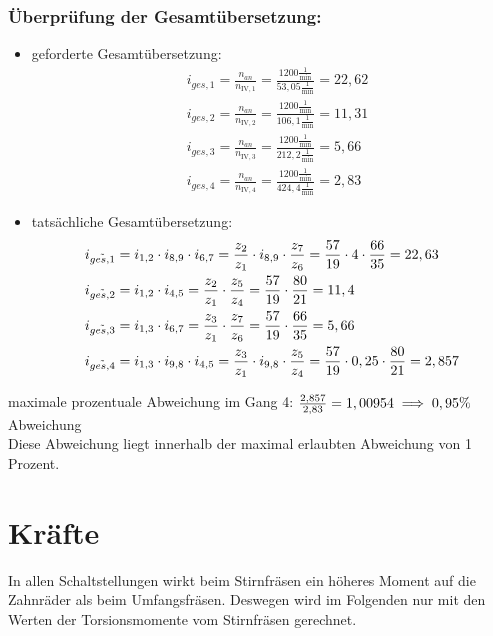 \subsubsection{Überprüfung der Gesamtübersetzung:}
\begin{itemize}
\item geforderte Gesamtübersetzung:
\begin{align*}
	&i_{ges,1} = \frac{n_{an}}{n_{\mathrm{IV},1}} = \frac{1200 \frac{1}{\text{min}}}{53,05 \frac{1}{\text{min}}} = 22,62 \\
	&i_{ges,2} = \frac{n_{an}}{n_{\mathrm{IV},2}} = \frac{1200 \frac{1}{\text{min}}}{106,1 \frac{1}{\text{min}}} = 11,31 \\
	&i_{ges,3} = \frac{n_{an}}{n_{\mathrm{IV},3}} = \frac{1200 \frac{1}{\text{min}}}{212,2 \frac{1}{\text{min}}} = 5,66 \\
	&i_{ges,4} = \frac{n_{an}}{n_{\mathrm{IV},4}} = \frac{1200 \frac{1}{\text{min}}}{424,4 \frac{1}{\text{min}}} = 2,83
\end{align*}

\item tatsächliche Gesamtübersetzung:
	\begin{align*}
	&i_{\tilde{ges,1}} = i_{1,2} \cdot i_{8,9} \cdot i_{6,7} = \frac{z_2}{z_1} \cdot  i_{8,9} \cdot \frac{z_{7}}{z_{6}} = \frac{57}{19} \cdot 4 \cdot \frac{66}{35}= 22,63 \\
	&i_{\tilde{ges,2}} = i_{1,2} \cdot i_{4,5} = \frac{z_2}{z_1} \cdot \frac{z_{5}}{z_{4}} = \frac{57}{19} \cdot \frac{80}{21} = 11,4 \\
	&i_{\tilde{ges,3}} = i_{1,3} \cdot i_{6,7} = \frac{z_3}{z_1} \cdot \frac{z_{7}}{z_{6}} = \frac{57}{19} \cdot \frac{66}{35} = 5,66\\
	&i_{\tilde{ges,4}} = i_{1,3} \cdot i_{9,8} \cdot i_{4,5} = \frac{z_3}{z_1} \cdot i_{9,8} \cdot \frac{z_{5}}{z_{4}} = \frac{57}{19} \cdot  0,25 \cdot \frac{80}{21} = 2,857
	\end{align*}
\end{itemize}
maximale prozentuale Abweichung im Gang 4: $\frac{2,857}{2,83} = 1,00954\\
\implies 0,95 \% $ Abweichung \\
Diese Abweichung liegt innerhalb der maximal erlaubten Abweichung von 1 Prozent.
\newpage
\section{Kräfte}
In allen Schaltstellungen wirkt beim Stirnfräsen ein höheres Moment auf die Zahnräder als beim Umfangsfräsen. Deswegen wird im Folgenden nur mit den Werten der Torsionsmomente vom Stirnfräsen gerechnet. 
